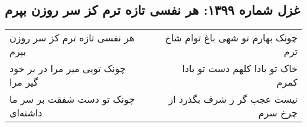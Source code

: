 \begin{center}
\section*{غزل شماره ۱۳۹۹: هر نفسی تازه ترم کز سر روزن بپرم}
\label{sec:1399}
\begin{longtable}{l p{0.5cm} r}
هر نفسی تازه ترم کز سر روزن بپرم
&&
چونک بهارم تو شهی باغ توام شاخ ترم
\\
چونک تویی میر مرا در بر خود گیر مرا
&&
خاک تو بادا کلهم دست تو بادا کمرم
\\
چونک تو دست شفقت بر سر ما داشته‌ای
&&
نیست عجب گر ز شرف بگذرد از چرخ سرم
\\
\end{longtable}
\end{center}
